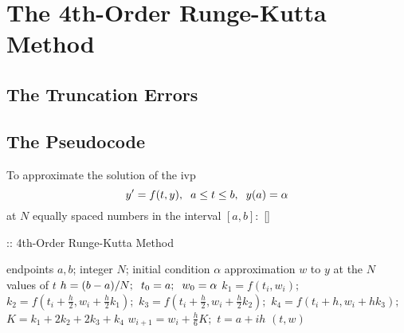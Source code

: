 \documentclass[12pt,oneside]{book}
\begin{document}
		\clearpage
	\section{The 4th-Order Runge-Kutta Method} \label{m:rk4}
		\begin{spacing}{1.2}
			
			
			
			\subsection*{The Truncation Errors}
			
			
			\subsection{The Pseudocode}
				To approximate the solution of the \ac{ivp} 
				\[ y' = f(t,y), \hspace*{0.2cm} a \leq t \leq b, \hspace*{0.2cm} y(a) = \alpha \]
				at $ N $ equally spaced numbers in the interval $ [a, b]: $ []
				
				\begin{algorithm}
					\caption{:: 4th-Order Runge-Kutta Method}
					\begin{algorithmic}[1]
						\REQUIRE endpoints $ a, b $; \hspace*{0.2cm} integer $ N $; \hspace*{0.2cm} initial condition $ \alpha $
						\ENSURE approximation $ w $ to $ y $ at the $ N $ values of $ t $
						\STATE $ h = (b - a) / N; \hspace*{0.2cm} t_0 = a; \hspace*{0.2cm} w_{0} = \alpha $
						\STATE $ k_{1} = f(t_{i},w_{i}); $ \hspace*{0.5cm} 
						\STATE $ k_{2} = f\left(t_{i} + \frac{h}{2}, w_{i} + \frac{h}{2}k_{1}\right); $
						\STATE $ k_{3} = f\left(t_{i} + \frac{h}{2}, w_{i} + \frac{h}{2}k_{2}\right); $
						\STATE $ k_{4} = f\left(t_{i} + h, w_{i} + hk_{3}\right); $
						\STATE $ K = k_{1} + 2k_{2} + 2k_{3} + k_{4}  $
						\STATE $ w_{i+1} = w_{i} + \frac{h}{6}K; $ \hspace*{0.5cm} 
						\STATE $ t = a + ih $ \hspace*{0.5cm} 
						\ENDFOR
						\RETURN $ (t, w) $
					\end{algorithmic}
				\end{algorithm}
			
		\end{spacing}
		
\end{document}
